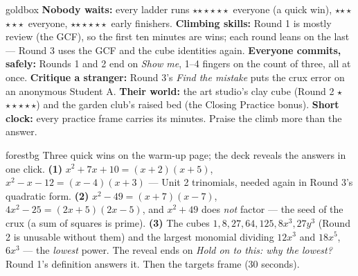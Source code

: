 \documentclass[10pt]{article}
\newcommand{\rung}[1]{{\color{goldacc}\ifcase#1\or$\star$\or$\star\star$\or$\star\star\star$\fi}}
\begin{document}
\begin{skillbox}{goldbox}
\textbf{Nobody waits:} every ladder runs \rung1\ everyone (a quick win), \rung2\ everyone,
\rung3\ early finishers. \textbf{Climbing skills:} Round 1 is mostly review (the GCF), so the
first ten minutes are wins; each round leans on the last --- Round 3 uses the GCF and the cube
identities again. \textbf{Everyone commits, safely:} Rounds 1 and 2 end on \emph{Show me}, 1--4
fingers on the count of three, all at once. \textbf{Critique a stranger:} Round 3's \emph{Find
the mistake} puts the crux error on an anonymous Student A. \textbf{Their world:} the art
studio's clay cube (Round 2 \rung3) and the garden club's raised bed (the Closing Practice
bonus). \textbf{Short clock:} every
practice frame carries its minutes. Praise the climb more than the answer.
\end{skillbox}

\begin{skillbox}{forestbg}
Three quick wins on the warm-up page; the deck reveals the answers in one click.
\textbf{(1)} $x^2+7x+10=(x+2)(x+5)$, $x^2-x-12=(x-4)(x+3)$ --- Unit 2 trinomials, needed again
in Round 3's quadratic form. \textbf{(2)} $x^2-49=(x+7)(x-7)$, $4x^2-25=(2x+5)(2x-5)$, and
$x^2+49$ does \emph{not} factor --- the seed of the crux (a sum of squares is prime).
\textbf{(3)} The cubes $1, 8, 27, 64, 125, 8x^3, 27y^3$ (Round 2 is unusable without them) and the
largest monomial dividing $12x^3$ and $18x^5$, $6x^3$ --- the \emph{lowest} power. The reveal
ends on \emph{Hold on to this: why the lowest?} Round 1's definition answers it. Then the
targets frame (30 seconds).
\end{skillbox}
\end{document}
